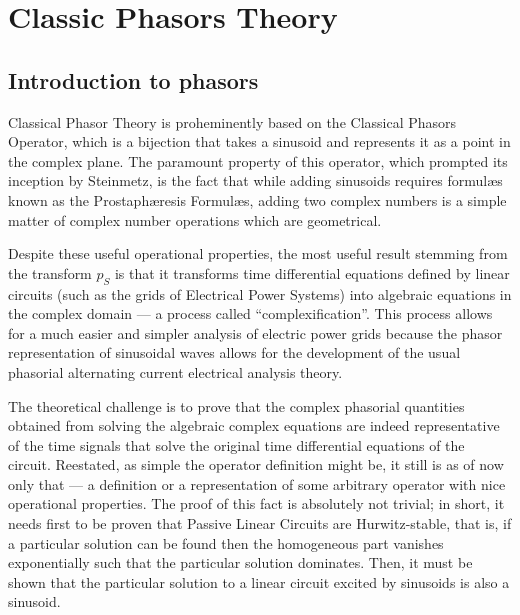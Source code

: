 \chapter{Classic Phasors Theory} \label{chapter:classical_phasors}

\section{Introduction to phasors} %

	Classical Phasor Theory is proheminently based on the Classical Phasors Operator, which is a bijection that takes a sinusoid and represents it as a point in the complex plane. The paramount property of this operator, which prompted its inception by Steinmetz, is the fact that while adding sinusoids requires formul\ae s known as the Prostaph\ae resis Formul\ae s, adding two complex numbers is a simple matter of complex number operations which are geometrical.

 Despite these useful operational properties, the most useful result stemming from the transform $p_S$ is that it transforms time differential equations defined by linear circuits (such as the grids of Electrical Power Systems) into algebraic equations in the complex domain — a process called ``complexification''. This process allows for a much easier and simpler analysis of electric power grids because the phasor representation of sinusoidal waves allows for the development of the usual phasorial alternating current electrical analysis theory.

	The theoretical challenge is to prove that the complex phasorial quantities obtained from solving the algebraic complex equations are indeed representative of the time signals that solve the original time differential equations of the circuit. Reestated, as simple the operator definition might be, it still is as of now only that — a definition or a representation of some arbitrary operator with nice operational properties. The proof of this fact is absolutely not trivial; in short, it needs first to be proven that Passive Linear Circuits are Hurwitz-stable, that is, if a particular solution can be found then the homogeneous part vanishes exponentially such that the particular solution dominates. Then, it must be shown that the particular solution to a linear circuit excited by sinusoids is also a sinusoid.

